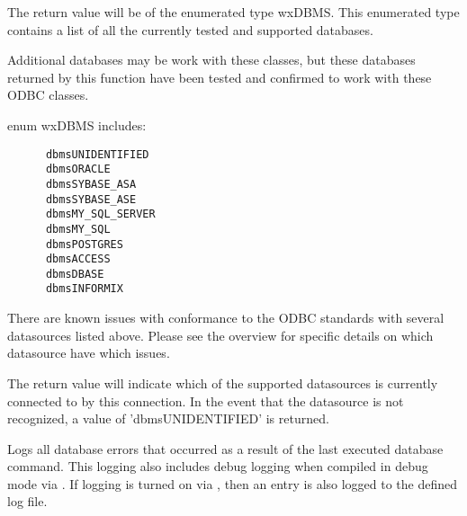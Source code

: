 \label{wxdbdbms}



The return value will be of the enumerated type wxDBMS.  This enumerated
type contains a list of all the currently tested and supported databases.

Additional databases may be work with these classes, but these databases
returned by this function have been tested and confirmed to work with 
these ODBC classes.

enum wxDBMS includes:

\begin{verbatim}
      dbmsUNIDENTIFIED
      dbmsORACLE
      dbmsSYBASE_ASA
      dbmsSYBASE_ASE
      dbmsMY_SQL_SERVER
      dbmsMY_SQL
      dbmsPOSTGRES
      dbmsACCESS
      dbmsDBASE
      dbmsINFORMIX  
\end{verbatim}

There are known issues with conformance to the ODBC standards with several
datasources listed above.  Please see the overview for specific details on
which datasource have which issues.


The return value will indicate which of the supported datasources is 
currently connected to by this connection.  In the event that the
datasource is not recognized, a value of 'dbmsUNIDENTIFIED' is returned.


\label{wxdbdispallerrors}


Logs all database errors that occurred as a result of the last executed 
database command.  This logging also includes debug logging when compiled in 
debug mode via .  If logging is turned on 
via , then an entry is also 
logged to the defined log file.






